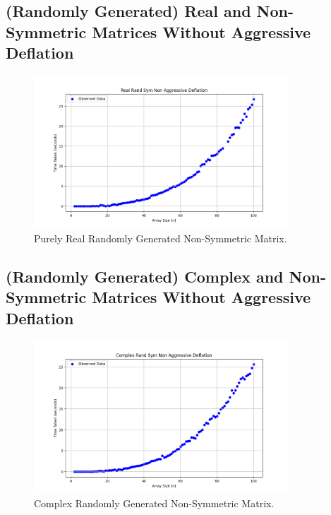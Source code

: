 \documentclass[12pt]{article}
\begin{document}
 	\subsection{(Randomly Generated) Real and Non-Symmetric Matrices Without Aggressive Deflation}
 	\begin{figure}[h]
 		\centering
 		\includegraphics[width=0.85\textwidth]{figs/rrnsnd.png}
 		\caption{Purely Real Randomly Generated Non-Symmetric Matrix.}
 	\end{figure}
 	\subsection{(Randomly Generated) Complex and Non-Symmetric Matrices Without Aggressive Deflation}
 	\begin{figure}[h]
 		\centering
 		\includegraphics[width=0.85\textwidth]{figs/crnsnd.png}
 		\caption{Complex Randomly Generated Non-Symmetric Matrix.}
 	\end{figure}
\end{document}
